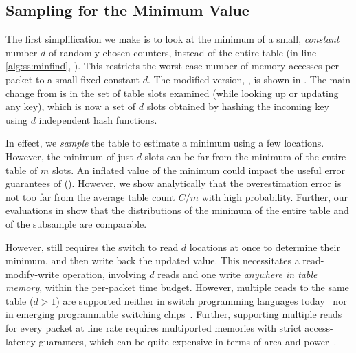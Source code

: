 \subsection{Sampling for the Minimum Value}
\label{sec:sampling-d}

The first simplification we make is to look at the minimum of a small, {\em
  constant} number $d$ of randomly chosen counters, instead of the entire table
(in line \ref{alg:ss:minfind}, ). This restricts the worst-case
number of memory accesses per packet to a small fixed constant $d$.  The
modified version, \Baseline, is shown in . The main change from
 is in the set of table slots examined (while looking up or
updating any key), which is now a set of $d$ slots obtained by hashing the
incoming key using $d$ independent hash functions.

In effect, we {\em sample} the table to estimate a minimum using a few
locations. However, the minimum of just $d$ slots can be far from the minimum of
the entire table of $m$ slots. An inflated value of the minimum could impact the
useful error guarantees of \spacesaving (). However, we
show analytically that the overestimation error is not too far from the average
table count $C/m$ with high probability. Further, our
evaluations in  show that the distributions of the
minimum of the entire table and of the subsample are comparable.



However,  still requires the switch to read $d$ locations at once
to determine their minimum, and then write back the updated value. This
necessitates a read-modify-write operation, involving $d$ reads and one write
{\em anywhere in table memory}, within the per-packet time budget. However,
multiple reads to the same table ($d > 1$) are supported neither in switch
programming languages today~\cite{bosshart2014p4} nor in emerging programmable
switching chips~\cite{RMT}. Further, supporting multiple reads for every packet
at line rate requires multiported memories with strict access-latency
guarantees, which can be quite expensive in terms of area and
power~\cite{cmos-vlsi-design-book, vlsi-memory-lecture}.

